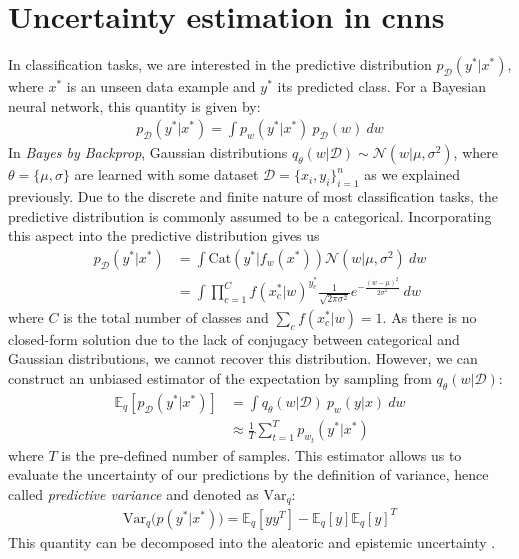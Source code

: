 \section{Uncertainty estimation in \acp{cnn}}
In classification tasks, we are interested in the predictive distribution $p_{\mathcal{D}}(y^*|x^*)$, where $x^*$ is an unseen data example and $y^*$ its predicted class. For a Bayesian neural network, this quantity is given by:
\begin{align}
p_{ \mathcal{D}}(y^*|x^*) = \int p_{w}(y^*|x^*) \ p_{\mathcal{D}}(w) \ dw
\end{align}
%
In \textit{Bayes by Backprop}, Gaussian distributions $q_{\theta}(w|\mathcal{D}) \sim \mathcal{N}(w|\mu, \sigma^2)$, where $\theta = \{ \mu, \sigma \}$ are learned with some dataset $\mathcal{D} = \{ x_{i}, y_{i} \}_{i=1}^{n}$ as we explained previously. Due to the discrete and finite nature of most classification tasks, the predictive distribution is commonly assumed to be a categorical. Incorporating this aspect into the predictive distribution gives us
\begin{align}
p_{\mathcal{D}}(y^*|x^*)& = \int \text{Cat}(y^*|f_w(x^*)) \mathcal{N}(w|\mu, \sigma^2) \ dw\\
&=  \int \prod_{c=1}^{C} f(x_{c}^*|w)^{y_{c}^*} \frac{1}{\sqrt{2\pi \sigma^2}} e^{-\frac{(w - \mu)^2}{2\sigma^2}} \ dw 
\end{align}
where $C$ is the total number of classes and $\sum_c f(x_{c}^*|w) = 1$.
\newline As there is no closed-form solution due to the lack of conjugacy between categorical and Gaussian distributions, we cannot recover this distribution. However, we can construct an unbiased estimator of the expectation by sampling from $q_{\theta}(w|\mathcal{D})$:
\begin{align}
\mathbb{E}_{q}[p_{\mathcal{D}}(y^*|x^*)] &= \int q_{\theta}(w|\mathcal{D}) \ p_w(y|x) \ dw \\ & \approx \frac{1}{T}\sum_{t=1}^{T} p_{w_t}(y^*|x^*)
\end{align}
where $T$ is the pre-defined number of samples.
This estimator allows us to evaluate the uncertainty of our predictions by the definition of variance, hence called \textit{predictive variance} and denoted as $\text{Var}_q$:
\begin{align} \label{variance}
\text{Var}_q\big( p(y^*|x^*) \big) = \mathbb{E}_q[yy^T] - \mathbb{E}_q[y]\mathbb{E}_q[y]^T
\end{align}
This quantity can be decomposed into the aleatoric and epistemic uncertainty \cite{kendall2017uncertainties,kwon2018uncertainty}. 
